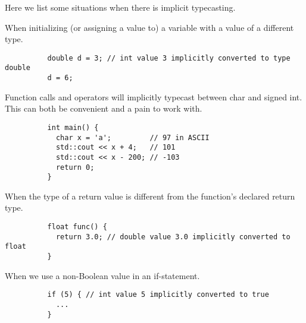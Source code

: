 \documentclass{article}
\begin{document}
      Here we list some situations when there is implicit typecasting. 

      \begin{lemma}
        When initializing (or assigning a value to) a variable with a value of a different type. 
        \begin{lstlisting}
          double d = 3; // int value 3 implicitly converted to type double 
          d = 6; 
        \end{lstlisting}
      \end{lemma}

      \begin{lemma}
        Function calls and operators will implicitly typecast between char and signed int. This can both be convenient and a pain to work with. 
        \begin{lstlisting}
          int main() { 
            char x = 'a';         // 97 in ASCII
            std::cout << x + 4;   // 101
            std::cout << x - 200; // -103
            return 0; 
          }
        \end{lstlisting}
      \end{lemma}

      \begin{lemma}
        When the type of a return value is different from the function's declared return type. 
        \begin{lstlisting}
          float func() {
            return 3.0; // double value 3.0 implicitly converted to float
          }
        \end{lstlisting}
      \end{lemma}

      \begin{lemma}
        When we use a non-Boolean value in an if-statement. 
        \begin{lstlisting}
          if (5) { // int value 5 implicitly converted to true
            ...
          }
        \end{lstlisting}
      \end{lemma}
\end{document}
